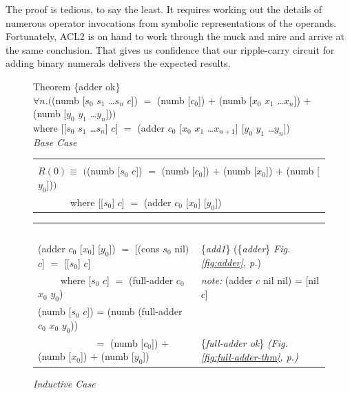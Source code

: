 The proof is tedious, to say the least.
It requires working out the details of
numerous operator invocations
from symbolic representations of the operands.
Fortunately, ACL2 is on hand to work through the
muck and mire and arrive at the same conclusion.
That gives us confidence that our ripple-carry circuit
for adding binary numerals delivers the expected results.

\begin{figure}
Theorem \{adder ok\}\\
$\forall n.($\textsf{(numb [$s_0$ $s_1$ \dots $s_{n}$ $c$])} $=$
\textsf{(numb [$c_0$])} $+$ \textsf{(numb [$x_0$ $x_1$ \dots $x_{n}$])} $+$ \textsf{(numb [$y_0$ $y_1$ \dots $y_{n}$])}$)$\\
\hphantom{(numb}where \textsf{[[$s_0$ $s_1$ \dots $s_{n}$] $c$]} $=$ \textsf{(adder $c_0$ [$x_0$ $x_1$ \dots $x_{n+1}$] [$y_0$ $y_1$ \dots $y_{n}$])}
~\\[1mm]
\emph{Base Case}
\begin{center}
\begin{tabular}{l}
\hline\\[-1.0em]
$R(0) \equiv$  $($\textsf{(numb [$s_0$ $c$])} $=$ \textsf{(numb [$c_0$])} $+$ \textsf{(numb [$x_0$])} $+$ \textsf{(numb [$y_0$])}$)$ \\
 ~~~~~~ where \textsf{[[$s_0$] $c$]} $=$ \textsf{(adder $c_0$ [$x_0$] [$y_0$])}
\\[2pt]
\hline
\end{tabular}
\begin{tabular}{ll}~\\[-1.0em]
\textsf{(adder $c_0$ [$x_0$] [$y_0$])} $=$ \textsf{[(cons $s_0$ nil) $c$]} $=$ \textsf{[[$s_0$] $c$]} & \{\emph{add1}\} (\{\emph{adder}\} \emph{Fig. \ref{fig:adder}, p.\pageref{fig:adder}}) \\
~~~~ where \textsf{[$s_0$ $c$]} $=$ \textsf{(full-adder $c_0$ $x_0$ $y_0$)}          & \emph{note:} (adder $c$ nil nil) = [nil $c$] \\
\textsf{(numb [$s_0$ $c$])} = \textsf{(numb (full-adder $c_0$ $x_0$ $y_0$))}          &  \\
~~~~~~~~~~~ $=$ \textsf{(numb [$c_0$])} $+$ \textsf{(numb [$x_0$])} $+$ \textsf{(numb [$y_0$])}  & \{\emph{full-adder ok}\} \emph{(Fig. \ref{fig:full-adder-thm}, p.\pageref{fig:full-adder-thm})}\\
\end{tabular}
\end{center}
\emph{Inductive Case}
\begin{center}
\begin{tabular}{l}

\end{tabular}
\end{center}
\end{figure}
